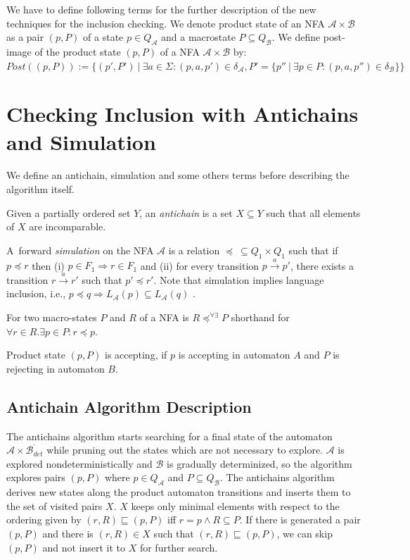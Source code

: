 We have to define following terms for the further description of the new techniques for the inclusion checking.
We denote product state of an NFA $\mathcal{A} \times \mathcal{B}$ as a pair $(p,P)$ of a state $p\in Q_\mathcal{A}$ and a macrostate $P \subseteq Q_\mathcal{B}$.
We define post-image of the product state $(p,P)$ of a NFA $\mathcal{A}\times \mathcal{B}$ by:\
$Post((p,P)):=\{(p',P')\ |\ \exists a \in \Sigma: (p,a,p')\in \delta_\mathcal{A}, P'=\{p''\ |\ \exists p \in P:(p,a,p'')\in \delta_\mathcal{B}\}\}$

\section{Checking Inclusion with Antichains and Simulation}
\label{sectionAntichain}
We define an antichain, simulation and some others terms before describing the algorithm itself.

Given a partially ordered set $Y$, an \emph {antichain} is a set $X \subseteq Y$ such that all elements of $X$ are incomparable.

A~forward \emph{simulation} on the NFA $\mathcal{A}$ is a relation $\preceq\  \subseteq Q_1 \times Q_1$ 
such that if $p \preceq r$ then (i) $p \in F_1 
\Rightarrow r \in F_1$ and (ii) for every transition $p\xrightarrow{a}p'$, there exists a transition 
$r\xrightarrow{a}r'$ such that $p' \preceq r'$. Note that simulation implies language inclusion, i.e., $p\preceq q \Rightarrow L_\mathcal{A}(p)
\subseteq L_\mathcal{A}(q)$ \cite{focs95}. %


%
For two macro-states $P$ and $R$ of a NFA is $R\preceq^{\forall\exists}P$ shorthand for $\forall r\in R.\exists p \in P: r \preceq p$.

Product state $(p,P)$ is accepting, if $p$ is accepting in automaton $A$ and $P$ is rejecting in automaton $B$.

\subsection{Antichain Algorithm Description}
The antichains algorithm \cite{cav06} starts searching for a final state of the automaton $\mathcal{A}\times \overline{\mathcal{B}_{det}}$ while
pruning out the states which are not necessary to explore. $\mathcal{A}$ is explored nondeterministically and $\mathcal{B}$ 
is gradually determinized, so the algorithm explores pairs $(p,P)$ where $p\in Q_\mathcal{A}$ and $P \subseteq Q_\mathcal{B}$. 
The antichains algorithm derives new states along the product automaton transitions and inserts them to the set of visited pairs $X$.
$X$ keeps only minimal elements with respect to the ordering given by $(r,R)\sqsubseteq (p,P)$ iff $r=p \wedge R \subseteq P$. 
If there is generated a pair $(p,P)$ and there is 
$(r,R)\in X$ such that $(r,R) \sqsubseteq (p,P)$, we can skip $(p,P)$ and not insert it to $X$ for further search.
 
